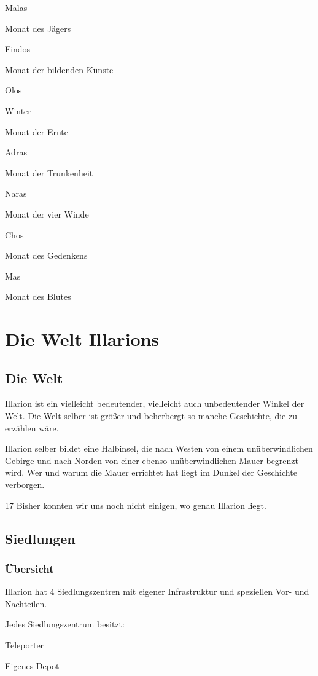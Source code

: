 \documentclass[a4paper,11pt]{book}
\begin{document}
Malas

Monat des Jägers

Findos

Monat der bildenden Künste

Olos

Winter

Monat der Ernte

Adras

Monat der Trunkenheit

Naras

Monat der vier Winde

Chos

Monat des Gedenkens

Mas

Monat des Blutes

\chapter{Die Welt Illarions}

\section{Die Welt}

Illarion ist ein vielleicht bedeutender, vielleicht auch unbedeutender Winkel der Welt. Die Welt selber ist größer und beherbergt so manche Geschichte, die zu erzählen wäre.

Illarion selber bildet eine Halbinsel, die nach Westen von einem unüberwindlichen Gebirge und nach Norden von einer ebenso unüberwindlichen Mauer begrenzt wird. Wer und warum die Mauer errichtet hat liegt im Dunkel der Geschichte verborgen.

17 Bisher konnten wir uns noch nicht einigen, wo genau Illarion liegt.

\section{Siedlungen}

\subsection{Übersicht}

Illarion hat 4 Siedlungszentren mit eigener Infrastruktur und speziellen Vor- und Nachteilen.

Jedes Siedlungszentrum besitzt:

Teleporter

Eigenes Depot
\end{document}
